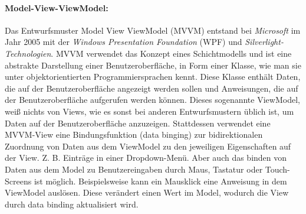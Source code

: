 \documentclass[nomenclature, onesided, 150]{HSMW-Thesis}
\begin{document}
		\paragraph{Model-View-ViewModel:}
			Das Entwurfsmuster Model View ViewModel (MVVM) entstand bei \textit{Microsoft} im Jahr 2005 mit der \textit{Windows Presentation Foundation} (WPF) und \textit{Silverlight-Technologien}. MVVM verwendet das Konzept eines Schichtmodells und ist eine abstrakte Darstellung einer Benutzeroberfläche, in Form einer Klasse, wie man sie unter objektorientierten Programmiersprachen kennt. Diese Klasse enthält Daten, die auf der Benutzeroberfläche angezeigt werden sollen und Anweisungen, die auf der Benutzeroberfläche aufgerufen werden können. Dieses sogenannte ViewModel, weiß nichts von Views, wie es sonst bei anderen Entwurfsmustern üblich ist, um Daten auf der Benutzeroberfläche anzuzeigen. Stattdessen verwendet eine MVVM-View eine Bindungsfunktion (data binging) zur bidirektionalen Zuordnung von Daten aus dem ViewModel zu den jeweiligen Eigenschaften auf der View. Z. B. Einträge in einer Dropdown-Menü. Aber auch das binden von Daten aus dem Model zu Benutzereingaben durch Maus, Tastatur oder Touch-Screens ist möglich. Beispielsweise kann ein Mausklick eine Anweisung in dem ViewModel auslösen. Diese verändert einen Wert im Model, wodurch die View durch data binding aktualisiert wird. \cite{freeman_pro_2017} \cite{bragge_model-view-controller_2013}
\end{document}
